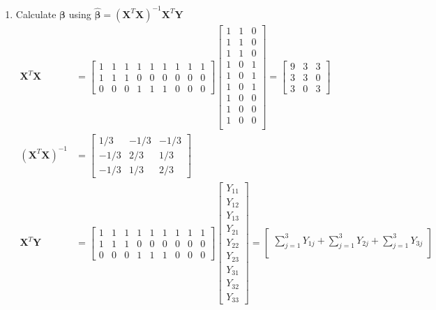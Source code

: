 \documentclass{article}
\begin{document}
\begin{enumerate}[leftmargin = 0 em, label = \arabic*., font = \bfseries]
\begin{enumerate}
		\item 
		Calculate $\bm \beta$ using $\hat{\bm \beta} = (\bm X^T \bm X)^{-1}\bm X^{T}\bm Y$
		\begin{align*}
		\bm X^T \bm X &= \begin{bmatrix}
			1&1&1&1&1&1&1&1&1\\
			1&1&1&0&0&0&0&0&0\\
			0&0&0&1&1&1&0&0&0
		\end{bmatrix} 
		\begin{bmatrix}
			1&1&0\\
			1&1&0\\
			1&1&0\\
			1&0&1\\
			1&0&1\\
			1&0&1\\
			1&0&0\\
			1&0&0\\
			1&0&0\\
		\end{bmatrix}
		= \begin{bmatrix}
			9&3&3\\
			3&3&0\\
			3&0&3
		\end{bmatrix}
		\\
		(\bm X^T \bm X)^{-1} &= 
		\begin{bmatrix}
			1/3 & -1/3 & -1/3\\
			-1/3 & 2/3 & 1/3\\
			-1/3 & 1/3 & 2/3
		\end{bmatrix}
		\\
		\bm X^T \bm Y & = \begin{bmatrix}
			1&1&1&1&1&1&1&1&1\\
			1&1&1&0&0&0&0&0&0\\
			0&0&0&1&1&1&0&0&0
		\end{bmatrix}
		\begin{bmatrix}
			Y_{11}\\
			Y_{12}\\
			Y_{13}\\
			Y_{21}\\
			Y_{22}\\
			Y_{23}\\
			Y_{31}\\
			Y_{32}\\
			Y_{33}
		\end{bmatrix}
		= \begin{bmatrix}
			\sum_{j = 1}^3 Y_{1j} + \sum_{j = 1}^3 Y_{2j} + \sum_{j = 1}^3 Y_{3j}\\

\end{bmatrix}
\end{align*}
\end{enumerate}
\end{enumerate}
\end{document}
